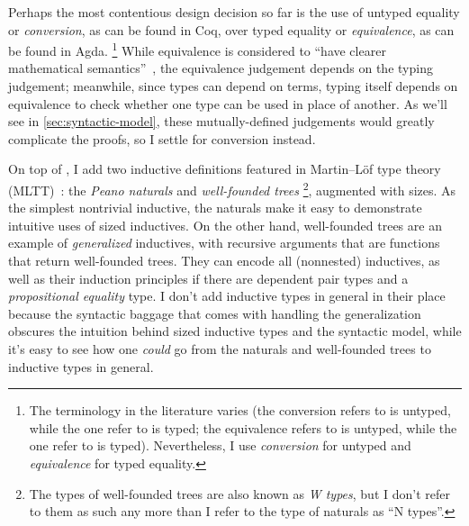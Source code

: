 Perhaps the most contentious design decision so far is the use of untyped equality
or \emph{conversion}, as can be found in Coq,
over typed equality or \emph{equivalence},
as can be found in Agda.%
\footnote{The terminology in the literature varies
(the conversion \citet{MetaCoq} refers to is untyped, while the one \citet{conversion} refer to is typed;
the equivalence \citet{wjb} refers to is untyped, while the one \citet{equivalence} refer to is typed).
Nevertheless, I use \emph{conversion} for untyped and \emph{equivalence} for typed equality.}
While equivalence is considered to ``have clearer mathematical semantics''~\citep{typed-NbE},
the equivalence judgement depends on the typing judgement;
meanwhile, since types can depend on terms,
typing itself depends on equivalence to check whether one type can be used in place of another.
As we'll see in \cref{sec:syntactic-model}, these mutually-defined judgements would greatly complicate the proofs,
so I settle for conversion instead.

On top of \GCC, I add two inductive definitions featured in Martin--L\"of type theory (MLTT)~\citep{mltt}:
the \emph{Peano naturals} and \emph{well-founded trees}%
\footnote{The types of well-founded trees are also known as \emph{W types},
but I don't refer to them as such any more than I refer to the type of naturals as ``N types''.},
augmented with sizes.
As the simplest nontrivial inductive,
the naturals make it easy to demonstrate intuitive uses of sized inductives.
On the other hand, well-founded trees are an example of \emph{generalized} inductives,
with recursive arguments that are functions that return well-founded trees.
They can encode all (nonnested) inductives,
as well as their induction principles \citep{whynotW} if there are dependent pair types
and a \emph{propositional equality} type.
I don't add inductive types in general in their place
because the syntactic baggage that comes with handling the generalization
obscures the intuition behind sized inductive types and the syntactic model,
while it's easy to see how one \emph{could} go from the naturals and well-founded trees
to inductive types in general.

\iffalse
Finally, I add a standard \emph{homogeneous propositional equality type}\index{propositional equality},
which isn't particularly difficult to deal with
and will allow for some more interesting examples.
\fi

